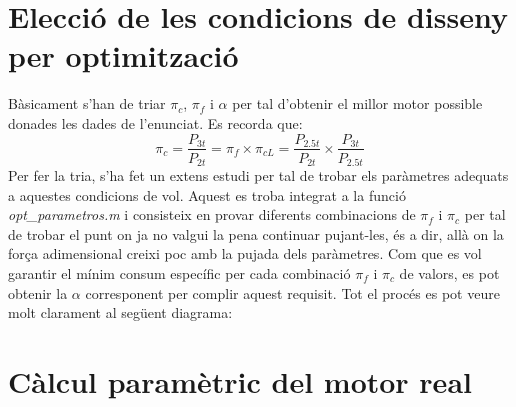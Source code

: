\section{Elecció de les condicions de disseny per optimització}
Bàsicament s'han de triar $\pi_c$, $\pi_f$ i $\alpha$ per tal d'obtenir el millor motor possible donades les dades de l'enunciat.
Es recorda que:
\begin{equation*}
	\pi_c = \frac{P_{3t}}{P_{2t}} = \pi_{f}\times\pi_{cL} = \frac{P_{2.5t}}{P_{2t}} \times \frac{P_{3t}}{P_{2.5t}}
\end{equation*}
Per fer la tria,  s'ha fet un extens estudi per tal de trobar els paràmetres adequats a aquestes condicions de vol. Aquest es troba integrat a la funció \textit{opt\_parametros.m} i consisteix en provar diferents combinacions de       $\pi_f$ i $\pi_c$ per tal de trobar el punt on ja no valgui la pena continuar pujant-les, és a dir, allà on la força adimensional creixi poc amb la pujada dels paràmetres. Com que es vol garantir el mínim consum específic per cada combinació  $\pi_f$ i $\pi_c$ de valors, es pot obtenir la $\alpha$ corresponent per complir aquest requisit. Tot el procés es pot veure molt clarament al següent diagrama:
\section{Càlcul paramètric del motor real}